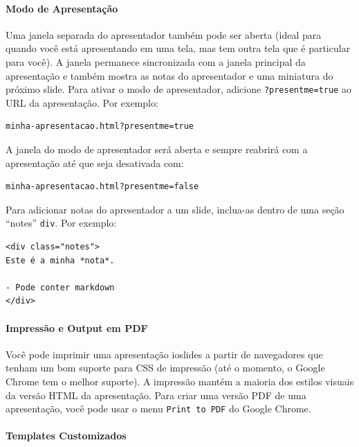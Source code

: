 \documentclass[
]{book}
\begin{document}
\hypertarget{modo-de-apresentauxe7uxe3o}{%
\paragraph{Modo de Apresentação}\label{modo-de-apresentauxe7uxe3o}}

Uma janela separada do apresentador também pode ser aberta (ideal para quando você está apresentando em uma tela, mas tem outra tela que é particular para você). A janela permanece sincronizada com a janela principal da apresentação e também mostra as notas do apresentador e uma miniatura do próximo slide. Para ativar o modo de apresentador, adicione \texttt{?presentme=true} ao URL da apresentação. Por exemplo:

\begin{verbatim}
minha-apresentacao.html?presentme=true
\end{verbatim}

A janela do modo de apresentador será aberta e sempre reabrirá com a apresentação até que seja desativada com:

\begin{verbatim}
minha-apresentacao.html?presentme=false
\end{verbatim}

Para adicionar notas do apresentador a um slide, inclua-as dentro de uma seção ``notes'' \texttt{div}. Por exemplo:

\begin{verbatim}
<div class="notes">
Este é a minha *nota*.

- Pode conter markdown
</div>
\end{verbatim}

\hypertarget{impressuxe3o-e-output-em-pdf}{%
\paragraph{Impressão e Output em PDF}\label{impressuxe3o-e-output-em-pdf}}

Você pode imprimir uma apresentação ioslides a partir de navegadores que tenham um bom suporte para CSS de impressão (até o momento, o Google Chrome tem o melhor suporte). A impressão mantém a maioria dos estilos visuais da versão HTML da apresentação.
Para criar uma versão PDF de uma apresentação, você pode usar o menu \texttt{Print\ to\ PDF} do Google Chrome.

\hypertarget{templates-customizados}{%
\paragraph{Templates Customizados}\label{templates-customizados}}
\end{document}
